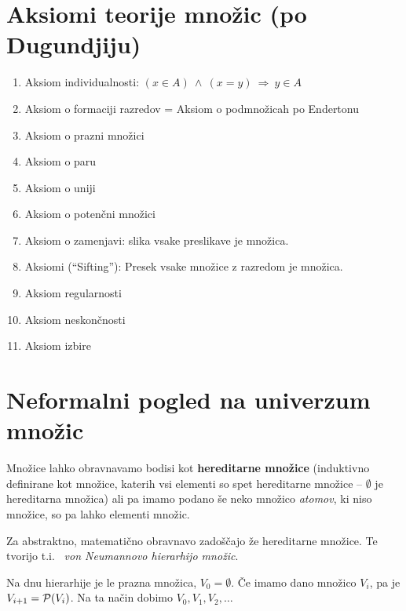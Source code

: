 \documentclass[11pt,paper=b5,footinclude,headinclude]{scrbook} %
\def\inn {{~\wedge~}}
\def\sledi {{~\Rightarrow~}}
\begin{document}
\section{Aksiomi teorije množic (po Dugundjiju)}

\begin{enumerate}
  \item Aksiom individualnosti: $(x\in A) \inn (x = y) \sledi y\in A$
   
  \item Aksiom o formaciji razredov = Aksiom o podmnožicah po Endertonu
  
  \item Aksiom o prazni množici

\item Aksiom o paru

  \item Aksiom o uniji
  
  \item Aksiom o potenčni množici

  \item Aksiom o zamenjavi: slika vsake preslikave je množica.

  \item Aksiomi (``Sifting''): Presek vsake množice z razredom je množica.

\item Aksiom regularnosti

  \item Aksiom neskončnosti

\item Aksiom izbire
\end{enumerate}


\section{Neformalni pogled na univerzum množic}

Množice lahko obravnavamo  bodisi kot \textbf{ hereditarne množice} (induktivno definirane kot množice, katerih vsi elementi so
spet hereditarne množice -- $\emptyset$ je hereditarna množica)
ali pa imamo podano še neko množico \emph{ atomov}, ki niso množice, so pa lahko elementi množic.

Za abstraktno, matematično obravnavo zadoščajo že hereditarne množice.
Te tvorijo t.i.~\emph{ von Neumannovo hierarhijo množic}.

Na dnu hierarhije je le prazna množica, $V_0 = \emptyset$.
Če imamo dano množico $V_i$, pa je $V_{i+1} = {\cal P}(V_i)$.
Na ta način dobimo $V_0, V_1, V_2, \ldots$
\end{document}
